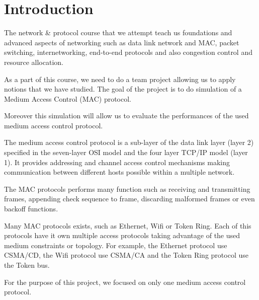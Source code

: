 \section{Introduction}

The network \& protocol course that we attempt teach us foundations and
advanced aspects of networking such as data link network and MAC, packet
switching, internetworking, end-to-end protocols and also congestion
control and resource allocation.

As a part of this course, we need to do a team project allowing us to
apply notions that we have studied. The goal of the project is to do
simulation of a Medium Access Control (MAC) protocol.

Moreover this simulation will allow us to evaluate the performances of
the used medium access control protocol.

The medium access control protocol is a sub-layer of the data link layer
(layer 2) specified in the seven-layer OSI model and the four layer
TCP/IP model (layer 1). It provides addressing and channel access
control mechanisms making communication between different hosts
possible within a multiple network.

The MAC protocols performs many function such as receiving and
transmitting frames, appending check sequence to frame, discarding
malformed frames or even backoff functions.

Many MAC protocols exists, such as Ethernet, Wifi or Token Ring. Each of
this protocols have it own multiple access protocols taking advantage of
the used medium constraints or topology. For example, the Ethernet
protocol use CSMA/CD, the Wifi protocol use CSMA/CA and the Token Ring
protocol use the Token bus.

For the purpose of this project, we focused on only one medium access
control protocol.

